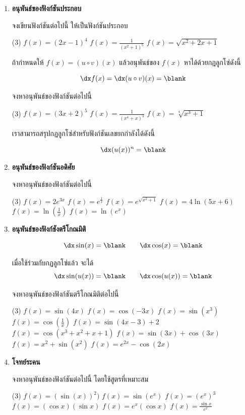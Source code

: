 \begin{enumerate}
\item \textbf{อนุพันธ์ของฟังก์ชันประกอบ}

จงเขียนฟังก์ชันต่อไปนี้ ให้เป็นฟังก์ชันประกอบ

\begin{tasks}[after-skip = 80pt](3)
\task $f(x) = (2x-1)^4$
\task $f(x) = \frac{1}{(x^2+1)^5}$
\task $f(x) = \sqrt{x^2+2x+1}$
\end{tasks}

ถ้ากำหนดให้ $f(x) = (u \circ v)(x)$ แล้วอนุพันธ์ของ $f(x)$ หาได้ด้วยกฎลูกโซ่ดังนี้

\[ \dx f(x) = \dx (u \circ v)(x) = \blank\]

จงหาอนุพันธ์ของฟังก์ชันต่อไปนี้
\begin{tasks}[after-skip = 80pt](3)
\task $f(x) = (3x+2)^5$
\task $f(x) = \frac{1}{(x^4+x)^3}$
\task $f(x) = \sqrt[4]{x^3 + 1}$
\end{tasks}

เราสามารถสรุปกฏลูกโซ่สำหรับฟังก์ชันเลขยกกำลังได้ดังนี้

\[ \dx (u(x))^n =  \blank\]

\item \textbf{อนุพันธ์ของฟังก์ชันอดิศัย}

จงหาอนุพันธ์ของฟังก์ชันต่อไปนี้
\begin{tasks}[after-skip=80pt, after-item-skip=80pt](3)
\task $f(x) = 2e^{3x}$
\task $f(x) = e^{\frac{1}{x}}$
\task $f(x) = e^{\sqrt{x^2+1}}$
\task $f(x) = 4\ln( 5x+6)$
\task $f(x) = \ln \left( \frac{1}{x} \right)$
\task $f(x) = \ln (e^x)$
\end{tasks}

\newpage

\item \textbf{อนุพันธ์ของฟังก์ชังตรีโกณมิติ}

\[ \dx \sin (x) = \blank \qquad \dx \cos(x) = \blank\]

เมื่อใช้ร่วมกับกฏลูกโซ่แล้ว จะได้
\[ \dx \sin (u(x)) = \blank \qquad \dx \cos (u(x)) = \blank\]

จงหาอนุพันธ์ของฟังก์ชันตรีโกณมิติต่อไปนี้
\begin{tasks}[after-skip=80pt, after-item-skip=80pt](3)
\task $f(x) = \sin(4x)$
\task $f(x) = \cos(-3x)$
\task $f(x) = \sin(x^3)$
\task $f(x) = \cos\left(\frac{1}{x}\right)$
\task $f(x) = \sin(4x-3) + 2$
\task $f(x) = \cos(x^3+x^2+x+1)$
\task $f(x) = \sin(3x) + \cos (3x) $
\task $f(x) = x^2 + \sin(x^2)$
\task $f(x) = e^{2x} - \cos(2x)$
\end{tasks}

\item \textbf{โจทย์ระคน}

จงหาอนุพันธ์ของฟังก์ชันต่อไปนี้ โดยใช้สูตรที่เหมาะสม
\begin{tasks}[after-skip=120pt, after-item-skip=120pt](3)
\task $f(x) = (\sin(x))^2)$ 
\task $f(x) = \sin(e^x)$
\task $f(x) = (e^x)^3$
\task $f(x) = (\cos x)(\sin x)$
\task $f(x) = e^x (\cos x)$
\task $f(x) = \frac{\sin x}{e^x}$
\end{tasks}

\end{enumerate}

